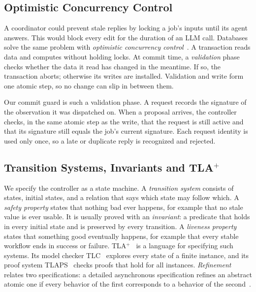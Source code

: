 \documentclass[10pt,journal,compsoc]{IEEEtran}
\theoremstyle{plain}
\theoremstyle{definition}
\begin{document}
\subsection{Optimistic Concurrency Control}\label{sec:bg-occ}
A coordinator could prevent stale replies by locking a job's inputs until its agent answers. This would block every edit for the duration of an LLM call. Databases solve the same problem with \emph{optimistic concurrency control}~\cite{occ}. A transaction reads data and computes without holding locks. At commit time, a \emph{validation} phase checks whether the data it read has changed in the meantime. If so, the transaction aborts; otherwise its writes are installed. Validation and write form one atomic step, so no change can slip in between them.

Our commit guard is such a validation phase. A request records the signature of the observation it was dispatched on. When a proposal arrives, the controller checks, in the same atomic step as the write, that the request is still active and that its signature still equals the job's current signature. Each request identity is used only once, so a late or duplicate reply is recognized and rejected.

\subsection{Transition Systems, Invariants and TLA$^+$}\label{sec:bg-tla}
We specify the controller as a state machine. A \emph{transition system} consists of states, initial states, and a relation that says which state may follow which. A \emph{safety property} states that nothing bad ever happens, for example that no stale value is ever usable. It is usually proved with an \emph{invariant}: a predicate that holds in every initial state and is preserved by every transition. A \emph{liveness property} states that something good eventually happens, for example that every stable workflow ends in success or failure. TLA$^+$~\cite{lamport1994tla,lamport2002specifying} is a language for specifying such systems. Its model checker TLC~\cite{yu1999tlc} explores every state of a finite instance, and its proof system TLAPS~\cite{cousineau2012tlaps} checks proofs that hold for all instances. \emph{Refinement} relates two specifications: a detailed asynchronous specification refines an abstract atomic one if every behavior of the first corresponds to a behavior of the second~\cite{abadi1991refinement,lynch1995simulations}.
\end{document}
